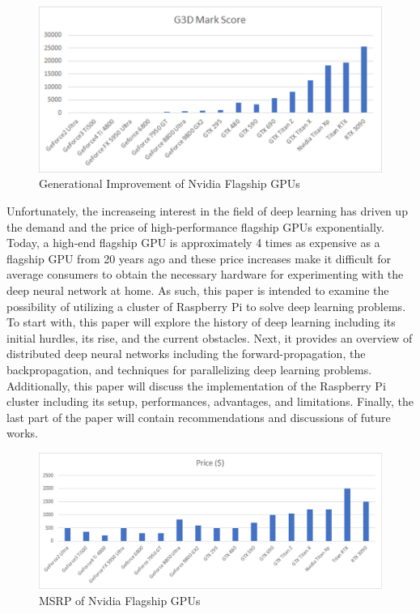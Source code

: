 \documentclass[conference]{IEEEtran}
\begin{document}
        \begin{figure}[!htb]
            \centering
            \captionsetup{justification=centering}
            \includegraphics[width=\linewidth]{GPU_Improvment.png}
            \caption{Generational Improvement of Nvidia Flagship GPUs}  
        \end{figure}
        
        Unfortunately, the increaseing interest in the field of deep learning has driven up the demand and the price of high-performance flagship GPUs exponentially. Today, a high-end flagship GPU is approximately 4 times as expensive as a flagship GPU from 20 years ago \cite{passmark_software} and these price increases make it difficult for average consumers to obtain the necessary hardware for experimenting with the deep neural network at home. As such, this paper is intended to examine the possibility of utilizing a cluster of Raspberry Pi to solve deep learning problems. To start with, this paper will explore the history of deep learning including its initial hurdles, its rise, and the current obstacles. Next, it provides an overview of distributed deep neural networks including the forward-propagation, the backpropagation, and techniques for parallelizing deep learning problems. Additionally, this paper will discuss the implementation of the Raspberry Pi cluster including its setup, performances, advantages, and limitations. Finally, the last part of the paper will contain recommendations and discussions of future works.

        \begin{figure}[!htb]
            \centering
            \captionsetup{justification=centering}
            \includegraphics[width=\linewidth]{GPU_Price.png}
            \caption{MSRP of Nvidia Flagship GPUs}  
        \end{figure}
\end{document}
